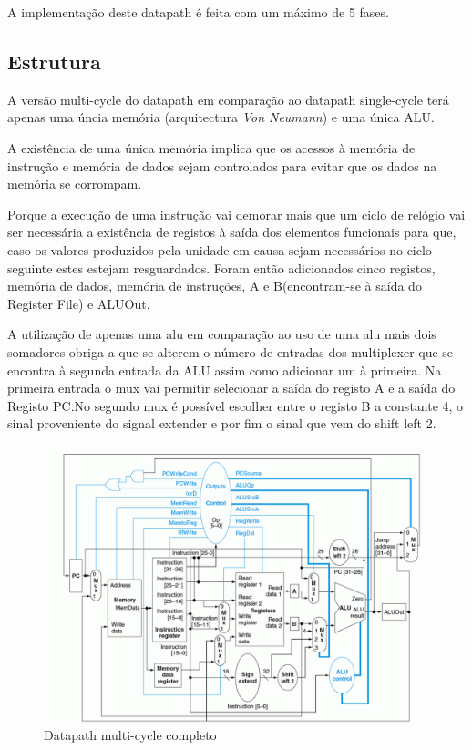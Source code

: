 \documentclass[10pt,a4paper]{book}
\begin{document}
		    A implementação deste datapath é feita com um máximo de 5 fases.

		    \subsection{Estrutura}

		    A versão multi-cycle do datapath em comparação ao datapath single-cycle terá apenas uma úncia memória (arquitectura \textit{Von Neumann}) e uma única ALU.

		    A existência de uma única memória implica que os acessos à memória de instrução e memória de dados sejam controlados para evitar que os dados na memória se corrompam.

		    Porque a execução de uma instrução vai demorar mais que um ciclo de relógio vai ser necessária a existência de registos à saída dos elementos funcionais para que, caso os valores produzidos pela unidade em causa sejam necessários no ciclo seguinte estes estejam resguardados. Foram então adicionados cinco registos, memória de dados, memória de instruções, A e B(encontram-se à saída do Register File) e ALUOut.

		    A utilização de apenas uma alu em comparação ao uso de uma alu mais dois somadores obriga a que se alterem o número de entradas dos multiplexer que se encontra à segunda entrada da ALU assim como adicionar um à primeira. Na primeira entrada o mux vai permitir selecionar a saída do registo A e a saída do Registo PC.No segundo mux é possível escolher entre o registo B a constante 4, o sinal proveniente do signal extender e por fim o sinal que vem do shift left 2.


		\begin{figure}[htp]
	    	\centering
	    	\includegraphics[scale=0.3]{mc1.png}
	    	\caption{Datapath multi-cycle completo}
	    	\label{multy-cycle Datapath}
		\end{figure}
\end{document}
